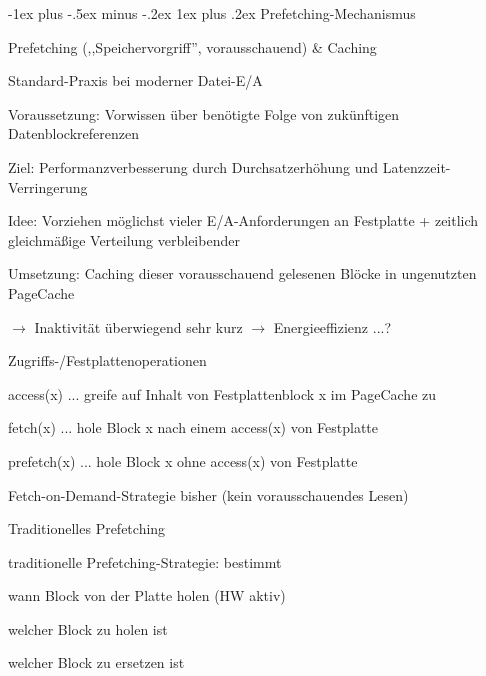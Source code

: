 \documentclass[a4paper]{article}
\makeatletter
\renewcommand{\subsubsection}{\@startsection{subsubsection}{3}{0mm}%
 {-1ex plus -.5ex minus -.2ex}%
 {1ex plus .2ex}%
 {\normalfont\small\bfseries}}
\makeatother
\begin{document}
\begin{multicols}{3}
    \subsubsection{Prefetching-Mechanismus}
    \begin{itemize*}
        \item Prefetching (,,Speichervorgriff'', vorausschauend) \& Caching
        \begin{itemize*}
            \item Standard-Praxis bei moderner Datei-E/A
            \item Voraussetzung: Vorwissen über benötigte Folge von zukünftigen Datenblockreferenzen
            \item Ziel: Performanzverbesserung durch Durchsatzerhöhung und Latenzzeit-Verringerung
            \item Idee: Vorziehen möglichst vieler E/A-Anforderungen an Festplatte + zeitlich gleichmäßige Verteilung verbleibender
            \item Umsetzung: Caching dieser vorausschauend gelesenen Blöcke in ungenutzten PageCache
        \end{itemize*}
        \item[$\rightarrow$] Inaktivität überwiegend sehr kurz $\rightarrow$ Energieeffizienz ...?
        \item Zugriffs-/Festplattenoperationen
        \begin{itemize*}
            \item access(x) ... greife auf Inhalt von Festplattenblock x im PageCache zu
            \item fetch(x) ... hole Block x nach einem access(x) von Festplatte
            \item prefetch(x) ... hole Block x ohne access(x) von Festplatte
        \end{itemize*}
        \item Fetch-on-Demand-Strategie bisher (kein vorausschauendes Lesen)
        \item Traditionelles Prefetching
        \begin{itemize*}
            \item traditionelle Prefetching-Strategie: bestimmt
            \begin{itemize*}
                \item wann Block von der Platte holen (HW aktiv)
                \item welcher Block zu holen ist
                \item welcher Block zu ersetzen ist

\end{itemize*}
\end{itemize*}
\end{itemize*}
\end{multicols}
\end{document}
